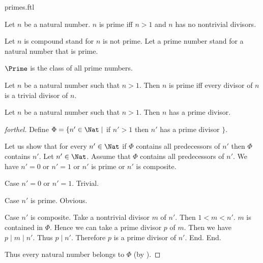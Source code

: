 \documentclass{naproche-library}
\begin{document}
\begin{smodule}[title=Prime Numbers]{primes.ftl}

\begin{definition}[forthel,id=ARITHMETIC_10_5450464558579712]
  Let $n$ be a natural number.
  $n$ is prime iff $n > 1$ and $n$ has no nontrivial divisors.

  Let $n$ is compound stand for $n$ is not prime.
  Let a prime number stand for a natural number that is prime.
\end{definition}

\begin{definition}[forthel,id=ARITHMETIC_10_3834705971511296]
  $\Prime$ is the class of all prime numbers.
\end{definition}

\begin{proposition}[forthel,id=ARITHMETIC_10_7801379464675328]
  Let $n$ be a natural number such that $n > 1$.
  Then $n$ is prime iff every divisor of $n$ is a trivial divisor of $n$.
\end{proposition}

\begin{proposition}[forthel,id=ARITHMETIC_10_3606185106210816]
  Let $n$ be a natural number such that $n > 1$.
  Then $n$ has a prime divisor.
\end{proposition}
\begin{proof}[forthel]
  Define $\Phi = \{ n' \in \Nat \mid$ if $n' > 1$ then $n'$ has a prime divisor $\}$.

  Let us show that for every $n' \in \Nat$ if $\Phi$ contains all
  predecessors of $n'$ then $\Phi$ contains $n'$.
    Let $n' \in \Nat$.
    Assume that $\Phi$ contains all predecessors of $n'$.
    We have $n' = 0$ or $n' = 1$ or $n'$ is prime or $n'$ is composite.

    Case $n' = 0$ or $n' = 1$. Trivial.

    Case $n'$ is prime. Obvious.

    Case $n'$ is composite.
      Take a nontrivial divisor $m$ of $n'$.
      Then $1 < m < n'$.
      $m$ is contained in $\Phi$.
      Hence we can take a prime divisor $p$ of $m$.
      Then we have $p \mid m \mid n'$.
      Thus $p \mid n'$.
      Therefore $p$ is a prime divisor of $n'$.
    End.
  End.

  Thus every natural number belongs to $\Phi$ (by ).
\end{proof}


\end{smodule}
\end{document}

